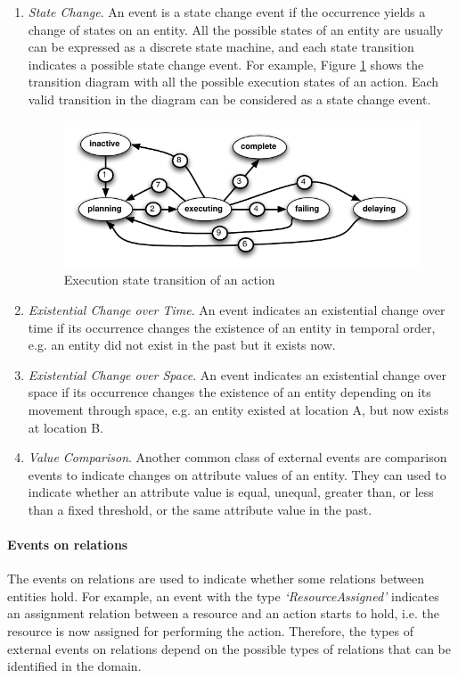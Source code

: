 \begin{enumerate}
	\item \emph{State Change}. An event is a state change event if the occurrence yields a change of states on an entity. All the possible states of an entity are usually can be expressed as a discrete state machine, and each state transition indicates a possible state change event. For example, Figure \ref{fig:action_exec_state_trans} shows the transition diagram with all the possible execution states of an action. Each valid transition in the diagram can be considered as a state change event.
	\begin{figure}[htbp] %
   	\centering
   	\includegraphics{action_exec_state_trans.pdf} 
   	\caption{Execution state transition of an action}
   	\label{fig:action_exec_state_trans}
	\end{figure}
	\item \emph{Existential Change over Time}. An event indicates an existential change over time if its occurrence changes the existence of an entity in temporal order, e.g. an entity did not exist in the past but it exists now.
	\item \emph{Existential Change over Space}. An event indicates an existential change over space if its occurrence changes the existence of an entity depending on its movement through space, e.g. an entity existed at location A, but now exists at location B. 
	\item \emph{Value Comparison}. Another common class of external events are comparison events to indicate changes on attribute values of an entity. They can used to indicate whether an attribute value is equal, unequal, greater than, or less than a fixed threshold, or the same attribute value in the past. 
\end{enumerate}

\paragraph*{Events on relations} %
\label{par:events_on_relations}
The events on relations are used to indicate whether some relations between entities hold. For example, an event with the type \emph{`ResourceAssigned'} indicates an assignment relation between a resource and an action starts to hold, i.e. the resource is now assigned for performing the action. Therefore, the types of external events on relations depend on the possible types of relations that can be identified in the domain. 

